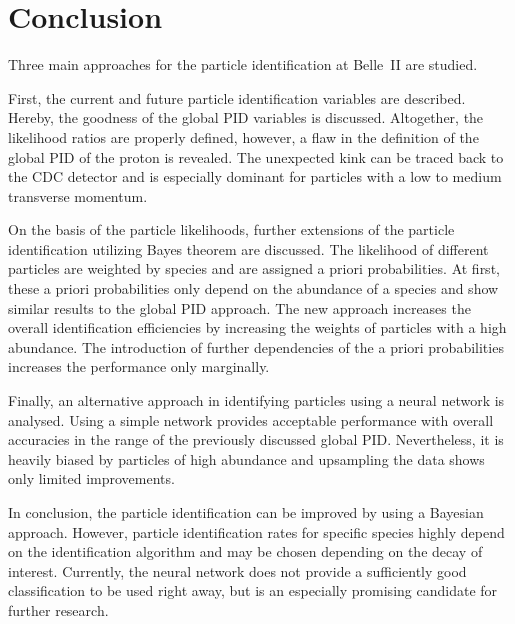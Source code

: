 \chapter{Conclusion}
\label{chap:conclusion}

Three main approaches for the particle identification at Belle~\RN{2} are studied.

First, the current and future particle identification variables are described. Hereby, the goodness of the global PID variables is discussed. Altogether, the likelihood ratios are properly defined, however, a flaw in the definition of the global PID of the proton is revealed. The unexpected kink can be traced back to the CDC detector and is especially dominant for particles with a low to medium transverse momentum.

On the basis of the particle likelihoods, further extensions of the particle identification utilizing Bayes theorem are discussed. The likelihood of different particles are weighted by species and are assigned a priori probabilities. At first, these a priori probabilities only depend on the abundance of a species and show similar results to the global PID approach. The new approach increases the overall identification efficiencies by increasing the weights of particles with a high abundance. The introduction of further dependencies of the a priori probabilities increases the performance only marginally.

Finally, an alternative approach in identifying particles using a neural network is analysed. Using a simple network provides acceptable performance with overall accuracies in the range of the previously discussed global PID. Nevertheless, it is heavily biased by particles of high abundance and upsampling the data shows only limited improvements.

In conclusion, the particle identification can be improved by using a Bayesian approach. However, particle identification rates for specific species highly depend on the identification algorithm and may be chosen depending on the decay of interest. Currently, the neural network does not provide a sufficiently good classification to be used right away, but is an especially promising candidate for further research.
